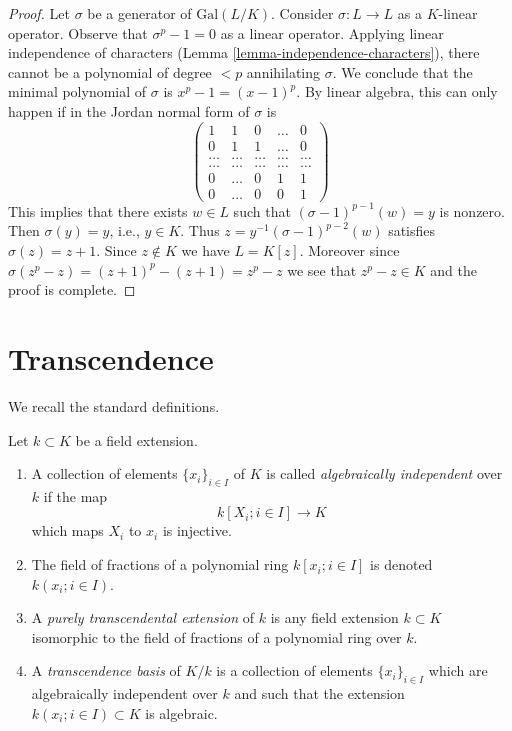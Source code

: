 \begin{proof}
Let $\sigma$ be a generator of $\text{Gal}(L/K)$.
Consider $\sigma : L \to L$ as a $K$-linear operator.
Observe that $\sigma^p - 1 = 0$ as a linear operator.
Applying linear independence of characters
(Lemma \ref{lemma-independence-characters}),
there cannot be a polynomial of degree $< p$
annihilating $\sigma$. We conclude that the minimal
polynomial of $\sigma$ is $x^p - 1 = (x - 1)^p$.
By linear algebra, this can only happen if in the
Jordan normal form of $\sigma$ is
$$
\left(
\begin{matrix}
1 & 1 & 0 & \ldots & 0 \\
0 & 1 & 1 & \ldots & 0 \\
\ldots & \ldots & \ldots & \ldots & \ldots \\
\ldots & \ldots & \ldots & \ldots & \ldots \\
0 & \ldots & 0 & 1 & 1 \\
0 & \ldots & 0 & 0 & 1
\end{matrix}
\right)
$$
This implies that there exists $w \in L$ such that
$(\sigma - 1)^{p - 1}(w) = y$ is nonzero. Then
$\sigma(y) = y$, i.e., $y \in K$. Thus
$z = y^{-1}(\sigma - 1)^{p - 2}(w)$ satisfies
$\sigma(z) = z + 1$. Since $z \not \in K$ we have $L = K[z]$.
Moreover since $\sigma(z^p - z) = (z + 1)^p - (z + 1) = z^p - z$
we see that $z^p - z \in K$ and the proof is complete.
\end{proof}







\section{Transcendence}
\label{section-transcendence}

\noindent
We recall the standard definitions.

\begin{definition}
\label{definition-transcendence}
Let $k \subset K$ be a field extension.
\begin{enumerate}
\item A collection of elements $\{x_i\}_{i \in I}$ of $K$ is called
{\it algebraically independent} over $k$ if the map
$$
k[X_i; i\in I] \longrightarrow K
$$
which maps $X_i$ to $x_i$ is injective.
\item The field of fractions of a polynomial ring
$k[x_i; i \in I]$ is denoted $k(x_i; i\in I)$.
\item A {\it purely transcendental extension} of $k$ is any
field extension $k \subset K$ isomorphic to the field of
fractions of a polynomial ring over $k$.
\item A {\it transcendence basis} of $K/k$ is a
collection of elements $\{x_i\}_{i \in I}$ which are
algebraically independent over $k$ and such that
the extension $k(x_i; i\in I) \subset K$ is algebraic.
\end{enumerate}
\end{definition}

